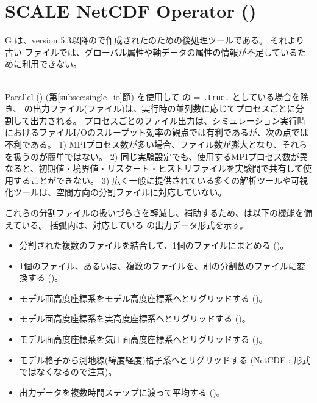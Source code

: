 \section{SCALE NetCDF Operator (\sno)} \label{sec:sno}

 \hrulefill
G
\sno は、version 5.3以降の\scalelib で作成された\scalenetcdf のための後処理ツールである。
それより古い \scalenetcdf ファイルでは、グローバル属性や軸データの属性の情報が不足しているために利用できない。

\noindent \hrulefill\\


Parallel \netcdf (\pnetcdf) (第\ref{subsec:single_io}節) を使用して
 の  = \verb|.true.| としている場合を除き、
\scalerm の出力ファイル(\scalenetcdf ファイル)は、実行時の並列数に応じてプロセスごとに分割して出力される。
プロセスごとのファイル出力は、シミュレーション実行時におけるファイルI/Oのスループット効率の観点では有利であるが、次の点では不利である。
1) MPIプロセス数が多い場合、ファイル数が膨大となり、それらを扱うのが簡単ではない。
2) 同じ実験設定でも、使用するMPIプロセス数が異なると、初期値・境界値・リスタート・ヒストリファイルを実験間で共有して使用することができない。
3) 広く一般に提供されている多くの解析ツールや可視化ツールは、空間方向の分割ファイルに対応していない。

これらの分割ファイルの扱いづらさを軽減し、補助するため、\sno は以下の機能を備えている。
括弧内は、対応している \sno の出力データ形式を示す。
\begin{itemize}
 \item 分割された複数のファイルを結合して、1個のファイルにまとめる (\scalenetcdf)。
 \item 1個のファイル、あるいは、複数のファイルを、別の分割数のファイルに変換する (\scalenetcdf)。
 \item モデル面高度座標系をモデル高度座標系へとリグリッドする (\scalenetcdf)。
 \item モデル面高度座標系を実高度座標系へとリグリッドする (\scalenetcdf)。
 \item モデル面高度座標系を気圧面高度座標系へとリグリッドする (\scalenetcdf)。
 \item モデル格子から測地線(緯度経度)格子系へとリグリッドする (NetCDF : \scalenetcdf 形式ではなくなるので注意)。
 \item 出力データを複数時間ステップに渡って平均する (\scalenetcdf)。
\end{itemize}



